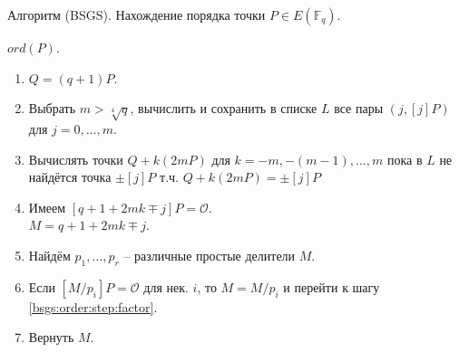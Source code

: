 \documentclass{beamer}
\begin{document}
\begin{frame}{Алгоритм (BSGS). Нахождение порядка точки}
 $P \in E(\mathbb{F}_q)$.

 $ord(P)$.
\begin{enumerate}
    \item $Q = (q+1) P$.
    \item Выбрать $m > \sqrt[4]{q}$, вычислить и сохранить в списке $L$ все пары $(j, [j] P)$ для $j = 0, \ldots, m$. \hfill{}
    \item \label{bsgs:order:step:giant}
    Вычислять точки $Q + k (2m P)$ для $k = -m, -(m-1), \ldots, m$ пока в $L$ не найдётся точка $\pm [j] P$ т.ч. $Q + k(2m P) = \pm [j] P$ \hfill{}
    \item Имеем $[q + 1 + 2 m k \mp j] P = \mathcal{O}$.\\$M = q + 1 + 2 m k \mp j$.
    \item \label{bsgs:order:step:factor} Найдём $p_1, \ldots, p_r$ -- различные простые делители $M$.
    \item Если $[M/p_i] P = \mathcal{O}$ для нек. $i$, то $M = M/p_i$ и перейти к шагу \ref{bsgs:order:step:factor}.
    \item Вернуть $M$.
\end{enumerate}
\end{frame}

\end{document}

